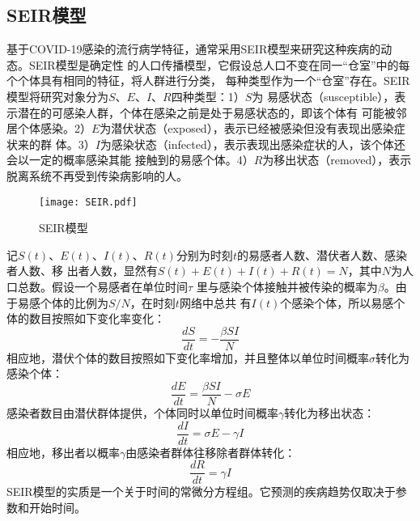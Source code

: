 \documentclass[lang=cn,11.9pt,a4paper,cite=authoryear]{elegantpaper}
\begin{document}
\subsection{SEIR模型}

基于COVID-19感染的流行病学特征，通常采用SEIR模型来研究这种疾病的动态。SEIR模型是确定性
的人口传播模型，它假设总人口不变在同一“仓室”中的每个个体具有相同的特征，将人群进行分类，
每种类型作为一个“仓室”存在。SEIR模型将研究对象分为$S$、$E$、$I$、$R$四种类型：1）$S$为
易感状态（susceptible），表示潜在的可感染人群，个体在感染之前是处于易感状态的，即该个体有
可能被邻居个体感染。2）$E$为潜伏状态（exposed），表示已经被感染但没有表现出感染症状来的群
体。3）$I$为感染状态（infected），表示表现出感染症状的人，该个体还会以一定的概率感染其能
接触到的易感个体。4）$R$为移出状态（removed），表示脱离系统不再受到传染病影响的人。

\begin{figure}
	\centering
	\texttt{[image: SEIR.pdf]}
	\caption{SEIR模型}
	\label{fig:SEIR}
\end{figure}

记$S(t)$、$E(t)$、$I(t)$、$R(t)$分别为时刻$t$的易感者人数、潜伏者人数、感染者人数、移
出者人数，显然有$S(t)+E(t)+I(t)+R(t)=N$，其中$N$为人口总数。假设一个易感者在单位时间$\tau$
里与感染个体接触并被传染的概率为$\beta$。由于易感个体的比例为$S/N$，在时刻$t$网络中总共
有$I(t)$个感染个体，所以易感个体的数目按照如下变化率变化：
\begin{equation}
\frac{dS}{dt}=-\frac{\beta SI}{N}
\end{equation}
相应地，潜伏个体的数目按照如下变化率增加，并且整体以单位时间概率$\sigma$转化为感染个体：
\begin{equation}
\frac{dE}{dt}=\frac{\beta SI}{N}-\sigma E
\end{equation}
感染者数目由潜伏群体提供，个体同时以单位时间概率$\gamma$转化为移出状态：
\begin{equation}
\frac{dI}{dt}=\sigma E-\gamma I
\end{equation}
相应地，移出者以概率$\gamma$由感染者群体往移除者群体转化：
\begin{equation}
\frac{dR}{dt}=\gamma I
\end{equation}
SEIR模型的实质是一个关于时间的常微分方程组。它预测的疾病趋势仅取决于参数和开始时间。
\end{document}
